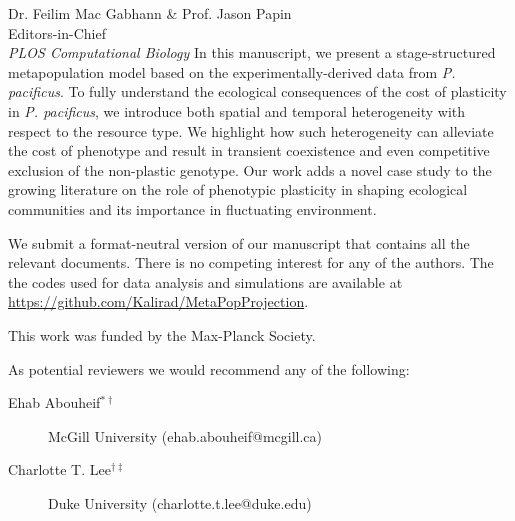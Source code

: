 \documentclass[11pt]{letter} %
\begin{document}
\begin{letter}{Dr. Feilim Mac Gabhann \& Prof. Jason Papin \\ Editors-in-Chief \\ \emph{PLOS Computational Biology}}
In this manuscript, we present a stage-structured metapopulation model based on the experimentally-derived data from \emph{P. pacificus}. To fully understand the ecological consequences of the cost of plasticity in \emph{P. pacificus}, we introduce both spatial and temporal heterogeneity with respect to the resource type. We highlight how such heterogeneity can alleviate the cost of phenotype and result in transient coexistence and even competitive exclusion of the non-plastic genotype. Our work adds a novel case study to the growing literature on the role of phenotypic plasticity in shaping ecological communities and its importance in fluctuating environment.  


We submit a format-neutral version of our manuscript that contains all the relevant documents. There is no competing interest for any of the authors. The the codes used for data analysis and simulations are available at \url{https://github.com/Kalirad/MetaPopProjection}. 

This work was funded by the Max-Planck Society.

As potential reviewers we would recommend any of the following:


\begin{description}
    \item[Ehab Abouheif$^{\ast\dag}$] 
    McGill University 
    (ehab.abouheif@mcgill.ca) 

    \item[Charlotte T. Lee$^{\dag\ddag}$] 
    Duke University 
    (charlotte.t.lee@duke.edu) 


\end{description}
\end{letter}
\end{document}
